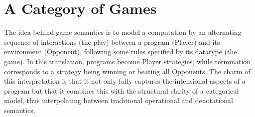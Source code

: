 \documentclass[runningheads,a4paper]{llncs}
\begin{document}
\section{A Category of Games}\vspace{-7pt}
The idea behind game semantics is to model a computation by an alternating sequence of interactions (the play) between a program (Player) and its environment (Opponent), following some rules specified by its datatype (the game). In this translation, programs become Player strategies, while termination corresponds to a strategy being winning or beating all Opponents. The charm of this interpretation is that it not only fully captures the intensional aspects of a program but that it combines this with the structural clarity of a categorical model, thus interpolating between traditional operational and denotational semantics.
\end{document}
